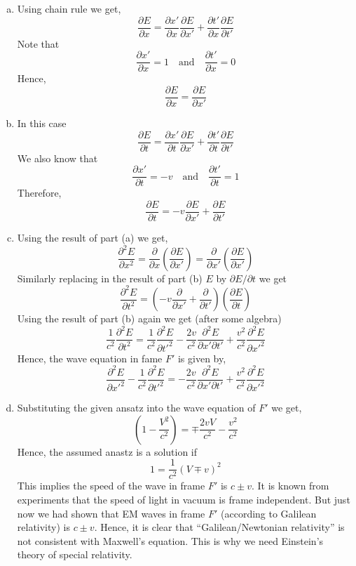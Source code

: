 \documentclass[makesolutionspdf]{esg8022pset}
\begin{document}
\begin{solution}
  \begin{enumerate}[(a)]
    \item Using chain rule we get,
      $$\frac{\partial E}{\partial x} = \frac{\partial x'}{\partial x}\frac{\partial E}{\partial x'} + \frac{\partial t'}{\partial x}\frac{\partial E}{\partial t'}$$
      Note that
      $$\frac{\partial x'}{\partial x} = 1 \quad \mbox{and} \quad  \frac{\partial t'}{\partial x} = 0$$
      Hence,
      $$\frac{\partial E}{\partial x} = \frac{\partial E}{\partial x'}$$
      
    \item In this case
      $$\frac{\partial E}{\partial t} = \frac{\partial x'}{\partial t}\frac{\partial E}{\partial x'} + \frac{\partial t'}{\partial t}\frac{\partial E}{\partial t'}$$
      We also know that
      $$\frac{\partial x'}{\partial t} = -v \quad \mbox{and} \quad  \frac{\partial t'}{\partial t} = 1$$
      Therefore,
      $$\frac{\partial E}{\partial t} = -v \frac{\partial E}{\partial x'} + \frac{\partial E}{\partial t'}$$
      
    \item Using the result of part (a) we get,
      $$\frac{\partial^2E}{\partial x^2}=\frac{\partial }{\partial x} ( \frac{\partial E}{\partial x'})= \frac{\partial }{\partial x'}(\frac{\partial E}{\partial x'}) $$
      Similarly replacing in the result of part (b) $E$ by ${\partial E}/\partial t$ we get 
      $$\frac{\partial^{2} E}{\partial t^{2}} = (-v \frac{\partial }{\partial x'} + \frac{\partial }{\partial t'}) ( \frac{\partial E}{\partial t} )$$
      Using the result of part (b) again we get (after some algebra)
      $$ \frac{1}{c^2} \frac{\partial^2E}{\partial t^2}= \frac{1}{c^2} \frac{\partial^2E}{\partial t'^2}  -\frac{2v}{c^2} \frac{\partial^2E}{\partial x' \partial t'} + \frac{v^2}{c^2} \frac{\partial^2E}{\partial x'^2}$$
      Hence, the wave equation in fame $F'$ is given by,
      $$\frac{\partial^2E}{\partial x'^2} - \frac{1}{c^2} \frac{\partial^2E}{\partial t'^2} = -\frac{2v}{c^2} \frac{\partial^2E}{\partial x' \partial t'} + \frac{v^2}{c^2} \frac{\partial^2E}{\partial x'^2}$$
      
    \item Substituting the given ansatz into the wave equation of $F'$ we get,
      $$(1 - \frac{V^{2}}{c^{2}})  = \mp\frac{2 vV}{c^{2}} - \frac{v^{2}}{c^{2}}$$
      Hence, the assumed anastz is a solution if
      $$1 = \frac{1}{c^{2}}( V \mp v)^{2} $$
      This implies the speed of the wave in frame $F'$ is $c\pm v$. It is known from experiments that the speed of light in vacuum is frame independent. But just now we had shown that EM waves in frame $F'$ (according to Galilean relativity) is $c\pm v$. Hence, it is clear that ``Galilean/Newtonian relativity'' is not consistent with Maxwell's equation. This is why we need Einstein's theory of special relativity. 
  \end{enumerate}
\end{solution}
\end{document}
